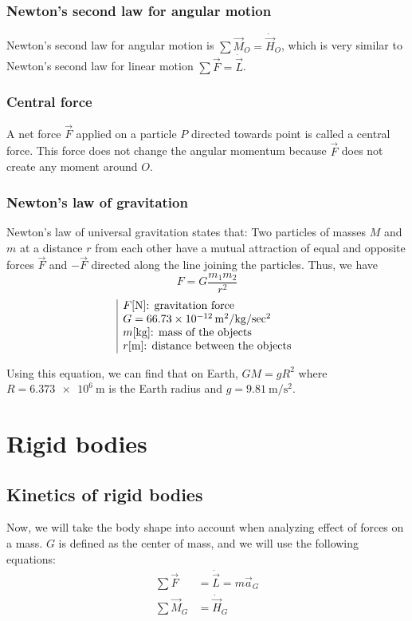 \documentclass[10pt, twocolumn]{article}
\begin{document}
\subsubsection{Newton's second law for angular motion}
Newton's second law for angular motion is \(\sum{\vec{M}_O} = \dot{\vec{H}}_O\), which is very similar to Newton's second law for linear motion \(\sum{\vec{F}} = \dot{\vec{L}}\).


\subsubsection{Central force}
A net force \(\vec{F}\) applied on a particle \(P\) directed towards point is called a central force.
This force does not change the angular momentum because \(\vec{F}\) does not create any moment around \(O\).


\subsubsection{Newton's law of gravitation}
Newton's law of universal gravitation states that:
Two particles of masses \(M\) and \(m\) at a distance \(r\) from each other have a mutual attraction  of equal and opposite forces \(\vec{F}\) and \(-\vec{F}\) directed along the line joining the particles.
Thus, we have
\[
  F = G \frac{m_1 m_2}{r^2}
\]
\[
  \begin{array}{|l}
    F [\si{\newton}] \text{: gravitation force}                      \\
    G = \SI{66.73 e-12}{\metre\squared\per\kilogram\per\sec\squared} \\
    m [\si{\kilogram}] \text{: mass of the objects}                  \\
    r [\si{\metre}] \text{: distance between the objects}
  \end{array}
\]

Using this equation, we can find that on Earth, \(GM = gR^2\) where \(R = \SI{6.373 e+6}{\metre}\) is the Earth radius and \(g = \SI{9.81}{\metre\per\second\squared}\).


\section{Rigid bodies}
\subsection{Kinetics of rigid bodies}
Now, we will take the body shape into account when analyzing effect of forces on a mass.
\(G\) is defined as the center of mass, and we will use the following equations:
\begin{align*}
  \sum{\vec{F}}   & = \dot{\vec{L}} = m\vec{a}_G \\
  \sum{\vec{M}_G} & = \dot{\vec{H}}_G
\end{align*}
\end{document}
